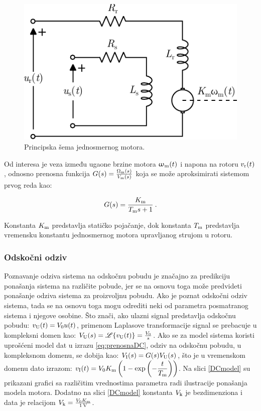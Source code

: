 \documentclass[a4paper, 12pt, diplomski]{etf}
\renewcommand{\unit}[1]{\,{\rm #1}}   %
\begin{document}
\begin{figure}[h!]
    \centering
    \includegraphics[scale=1]{fig/DCmotor.pdf}
    \caption{Principska šema jednosmernog motora.}
    \label{blokDC}
\end{figure}

\noindent
Od interesa je veza između ugaone brzine motora $\upomega_{\rm m}(t)$ i napona na rotoru $v_{\rm r}(t)$, odnosno prenosna funkcija $G(s) = \frac{\Omega_{\rm m}(s)}{V_{\rm m}(s)}$ koja se može aproksimirati sistemom prvog reda kao:

\begin{equation}
	G(s) = \frac{K_{\rm m}}{T_{\rm m}s+1}\:.
	\label{eq:prenosnaDC}
\end{equation}

\noindent
Konstanta $K_{\rm m}$ predstavlja statičko pojačanje, dok konstanta $T_{\rm m}$ predstavlja vremensku konstantu jednosmernog motora upravljanog strujom u rotoru. \cite{osuDC}

\break

\subsubsection{Odskočni odziv}

Poznavanje odziva sistema na odskočnu pobudu je značajno za predikciju ponašanja sistema na različite pobude, jer se na osnovu toga može predvideti ponašanje odziva sistema za proizvoljnu pobudu. 
Ako je poznat odskočni odziv sistema, tada se na osnovu toga mogu odrediti neki od parametra posmatranog sistema i njegove osobine.
Što znači, ako ulazni signal predstavlja odskočnu pobudu: $v_{\rm U}(t) = V_0u(t)$, primenom Laplasove transformacije signal se prebacuje u kompleksni domen kao: $V_{\rm U}(s) = \mathscr{L}\{ v_{\rm U}(t) \} = \frac{V_0}{s}$.
Ako se za model sistema koristi uprošćeni model dat u izrazu \eqref{eq:prenosnaDC}, odziv na odskočnu pobudu, u kompleksnom domenu, se  dobija kao:
$V_{\rm I}(s) = G(s) V_{\rm U}(s)$, što je u vremenskom domenu dato izrazom: $v_{\rm I}(t) = V_0K_{\rm m}\left(1 - \exp \left( - \dfrac{t}{T_{\rm m}}  \right) \right) $. Na slici \ref{DCmodel} su prikazani grafici sa različitim vrednostima parametra radi ilustracije ponašanja modela motora. Dodatno na slici \ref{DCmodel} konstanta $V_{\rm k}$ je bezdimenziona i data je relacijom $V_{\rm k} = \frac{V_0K_{\rm m}}{1\unit{V}}$.
\end{document}
